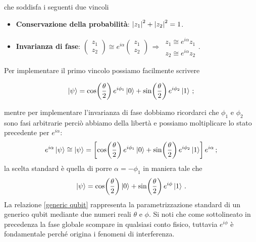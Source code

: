 \noindent che soddisfa i seguenti due vincoli
\begin{itemize}
    \item \textbf{Conservazione della probabilità}: $\abs{z_1}^2 + \abs{z_2}^2 = 1$. 
    \item \textbf{Invarianza di fase}: $ \begin{pmatrix} z_1 \\ z_2 \end{pmatrix} \cong e^{i\alpha} \begin{pmatrix} z_1 \\ z_2 \end{pmatrix} \, \Rightarrow \, \begin{matrix} z_1 \cong e^{i\alpha} z_1 \\ z_2 \cong e^{i\alpha} z_2 \end{matrix}$.
\end{itemize}

\noindent Per implementare il primo vincolo possiamo facilmente scrivere

\begin{equation*}
    \ket{\psi} = \cos \! \left( \frac{\theta}{2} \right) e^{i \phi_1} \ket{0} + \sin \! \left( \frac{\theta}{2} \right) e^{i \phi_2} \ket{1} \, ;
\end{equation*}

\noindent mentre per implementare l'invarianza di fase dobbiamo ricordarci che $\phi_1$ e $\phi_2$ sono fasi arbitrarie perciò abbiamo della libertà e possiamo moltiplicare lo stato precedente per $e^{i \alpha}$:
\begin{equation*}
    e^{i \alpha} \ket{\psi} \cong \ket{\psi} = \left[ \cos \! \left( \frac{\theta}{2} \right) e^{i \phi_1} \ket{0} + \sin \! \left( \frac{\theta}{2} \right) e^{i \phi_2} \ket{1} \right] e^{i \alpha} \, ;
\end{equation*}
\noindent la scelta standard è quella di porre $\alpha = - \phi_1$ in maniera tale che
\begin{equation}\label{generic qubit}
    \ket{\psi} = \cos \! \left( \frac{\theta}{2} \right) \ket{0} + \sin \! \left( \frac{\theta}{2} \right) e^{i \phi} \ket{1} \, .
\end{equation}
La relazione \eqref{generic qubit} rappresenta la parametrizzazione standard di un generico qubit mediante due numeri reali $\theta$ e $\phi$. Si noti che come sottolineato in precedenza la fase globale scompare in qualsiasi conto fisico, tuttavia $e^{i \phi}$ è fondamentale perché origina i fenomeni di interferenza. 

